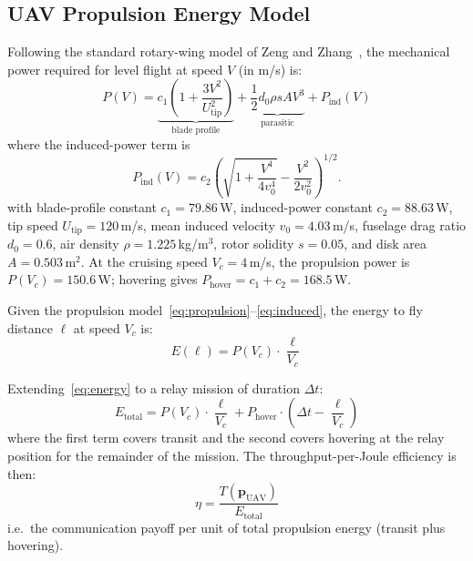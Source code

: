 \documentclass[journal]{IEEEtran}
\begin{document}
\subsection{UAV Propulsion Energy Model}

Following the standard rotary-wing model of Zeng and Zhang~\cite{zeng2017energy}, the mechanical power required for level flight at speed $V$ (in m/s) is:
\begin{equation}
    P(V) = \underbrace{c_1\!\left(1 + \frac{3V^2}{U_\text{tip}^2}\right)}_{\text{blade profile}} + \underbrace{\frac{1}{2}d_0 \rho s A V^3}_{\text{parasitic}} + P_\text{ind}(V)
    \label{eq:propulsion}
\end{equation}
where the induced-power term is
\begin{equation}
    P_\text{ind}(V) = c_2\!\left(\sqrt{1 + \frac{V^4}{4v_0^4}} - \frac{V^2}{2v_0^2}\right)^{\!1/2}.
    \label{eq:induced}
\end{equation}
with blade-profile constant $c_1 = 79.86$\,W, induced-power constant $c_2 = 88.63$\,W, tip speed $U_\text{tip} = 120$\,m/s, mean induced velocity $v_0 = 4.03$\,m/s, fuselage drag ratio $d_0 = 0.6$, air density $\rho = 1.225$\,kg/m$^3$, rotor solidity $s = 0.05$, and disk area $A = 0.503$\,m$^2$. At the cruising speed $V_c = 4$\,m/s, the propulsion power is $P(V_c) = 150.6$\,W; hovering gives $P_\text{hover} = c_1 + c_2 = 168.5$\,W.

Given the propulsion model~\eqref{eq:propulsion}--\eqref{eq:induced}, the energy to fly distance $\ell$ at speed $V_c$ is:
\begin{equation}
    E(\ell) = P(V_c) \cdot \frac{\ell}{V_c}
    \label{eq:energy}
\end{equation}

Extending~\eqref{eq:energy} to a relay mission of duration $\Delta t$:
\begin{equation}
    E_\text{total} = P(V_c) \cdot \frac{\ell}{V_c} + P_\text{hover} \cdot \left(\Delta t - \frac{\ell}{V_c}\right)
    \label{eq:energy_total}
\end{equation}
where the first term covers transit and the second covers hovering at the relay position for the remainder of the mission. The throughput-per-Joule efficiency is then:
\begin{equation}
    \eta = \frac{T(\mathbf{p}_\text{UAV})}{E_\text{total}}
    \label{eq:efficiency}
\end{equation}
i.e.\ the communication payoff per unit of total propulsion energy (transit plus hovering).
\end{document}
